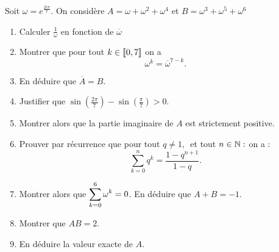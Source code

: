 \documentclass[a4paper, 11pt]{article}
\begin{document}
\begin{exercice}
Soit $\omega =e^{\frac{2i\pi}{7}}$. On considère $A=\omega+\omega^2 +\omega^4$ et $B =\omega^3+\omega^5 +\omega^6$

\begin{enumerate}
\item Calculer $\frac{1}{\omega}$ en fonction de $\overline{\omega}$
\item Montrer que pour tout $k\in \llbracket 0,7\rrbracket$ on a 
$$\omega^k =\overline{\omega}^{7-k}.$$
\item En déduire que $\overline{A}=B$.
\item Justifier que $\sin\left( \frac{2\pi}{7}\right)-\sin\left( \frac{\pi}{7}\right)>0$.
\item Montrer alors que la partie imaginaire de $A$ est strictement positive.
\item  Prouver par récurrence que pour tout  $ q\neq 1, \,$ et tout $ n\in \mathbb{N} : $ on a : 
$$\sum_{k=0}^n q^k =\frac{1-q^{n+1}}{1-q}.$$
\item Montrer alors que $\displaystyle \sum_{k=0}^6 \omega^k =0$. En déduire que $A+B=-1$.
\item Montrer que $AB=2$. 

\item En déduire la valeur exacte de $A$.


\end{enumerate}
\end{exercice}
\end{document}
